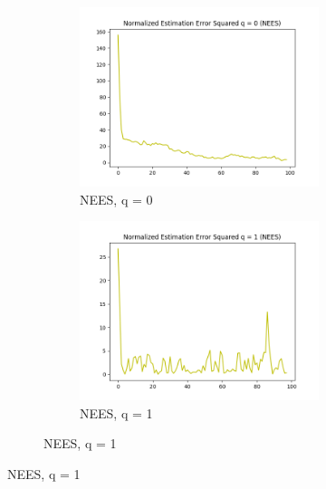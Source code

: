 \documentclass{article}
\begin{document}
        \begin{figure}[H]
            \centering 
            \begin{subfigure}{1\textwidth}  
                \begin{subfigure}{.3\textwidth}  
                    \includegraphics[width=1\linewidth]{./img/nees_0.png}
                    \caption{NEES, q = 0 }
                \end{subfigure}
                \begin{subfigure}{.3\textwidth}  
                    \includegraphics[width=1\linewidth]{./img/nees_1.png}
                    \caption{NEES, q = 1 }
                \end{subfigure}

\end{subfigure}
\end{figure}
\end{document}
